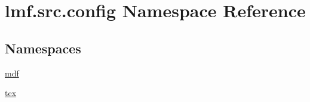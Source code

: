 \hypertarget{namespacelmf_1_1src_1_1config}{\section{lmf.\+src.\+config Namespace Reference}
\label{namespacelmf_1_1src_1_1config}
}
\subsection*{Namespaces}
\begin{DoxyCompactItemize}
\item 
 \hyperlink{namespacelmf_1_1src_1_1config_1_1mdf}{mdf}
\item 
 \hyperlink{namespacelmf_1_1src_1_1config_1_1tex}{tex}
\end{DoxyCompactItemize}
